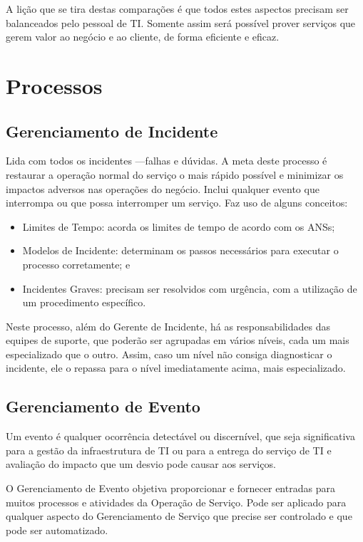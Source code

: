 A lição que se tira destas comparações é que todos estes aspectos precisam ser
balanceados pelo pessoal de TI. Somente assim será possível prover serviços que
gerem valor ao negócio e ao cliente, de  forma eficiente e eficaz.


\section{Processos}
\label{sec:opera:processos}
\subsection{Gerenciamento de Incidente}
Lida com todos os incidentes ---falhas e dúvidas. A meta deste processo é
restaurar a operação normal do serviço o mais rápido possível e minimizar os
impactos adversos nas operações do negócio. Inclui qualquer evento que
interrompa ou que possa interromper um serviço. Faz uso de alguns conceitos:
\begin{itemize}
	\item Limites de Tempo: acorda os limites de tempo de acordo com os ANSs;
    \item Modelos de Incidente: determinam os passos necessários para executar
        o processo corretamente; e
    \item Incidentes Graves: precisam ser resolvidos com urgência, com a
        utilização de um procedimento específico.
\end{itemize}

Neste processo, além do Gerente de Incidente, há as responsabilidades das
equipes de suporte, que poderão ser agrupadas em vários níveis, cada um mais
especializado que o outro. Assim, caso um nível não consiga diagnosticar o
incidente, ele o repassa para o nível imediatamente acima, mais especializado.


\subsection{Gerenciamento de Evento}
Um evento é qualquer ocorrência detectável ou discernível, que seja
significativa para a gestão da infraestrutura de TI ou para a entrega do
serviço de TI e avaliação do impacto que um desvio pode causar aos serviços.

O Gerenciamento de Evento objetiva proporcionar e fornecer entradas para muitos
processos e atividades da Operação de Serviço. Pode ser aplicado para qualquer
aspecto do Gerenciamento de Serviço que precise ser controlado e que pode ser
automatizado.

